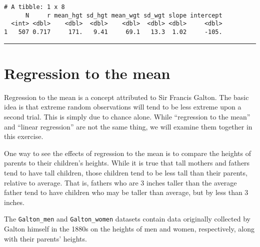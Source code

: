 \documentclass[
]{book}
\newenvironment{Shaded}{\begin{snugshade}}{\end{snugshade}}
\newcommand{\CommentTok}[1]{\textcolor[rgb]{0.56,0.35,0.01}{\textit{#1}}}
\newcommand{\DataTypeTok}[1]{\textcolor[rgb]{0.13,0.29,0.53}{#1}}
\newcommand{\KeywordTok}[1]{\textcolor[rgb]{0.13,0.29,0.53}{\textbf{#1}}}
\newcommand{\NormalTok}[1]{#1}
\newcommand{\OperatorTok}[1]{\textcolor[rgb]{0.81,0.36,0.00}{\textbf{#1}}}
\newcommand{\StringTok}[1]{\textcolor[rgb]{0.31,0.60,0.02}{#1}}
\begin{document}
\begin{Shaded}
\end{Shaded}

\begin{verbatim}
# A tibble: 1 x 8
      N     r mean_hgt sd_hgt mean_wgt sd_wgt slope intercept
  <int> <dbl>    <dbl>  <dbl>    <dbl>  <dbl> <dbl>     <dbl>
1   507 0.717     171.   9.41     69.1   13.3  1.02     -105.
\end{verbatim}

\begin{center}\rule{0.5\linewidth}{0.5pt}\end{center}

\hypertarget{regression-to-the-mean}{%
\section{Regression to the mean}\label{regression-to-the-mean}}

Regression to the mean is a concept attributed to Sir Francis Galton. The basic idea is that extreme random observations will tend to be less extreme upon a second trial. This is simply due to chance alone. While ``regression to the mean'' and ``linear regression'' are not the same thing, we will examine them together in this exercise.

One way to see the effects of regression to the mean is to compare the heights of parents to their children's heights. While it is true that tall mothers and fathers tend to have tall children, those children tend to be less tall than their parents, relative to average. That is, fathers who are 3 inches taller than the average father tend to have children who may be taller than average, but by less than 3 inches.

The \texttt{Galton\_men} and \texttt{Galton\_women} datasets contain data originally collected by Galton himself in the 1880s on the heights of men and women, respectively, along with their parents' heights.
\end{document}
